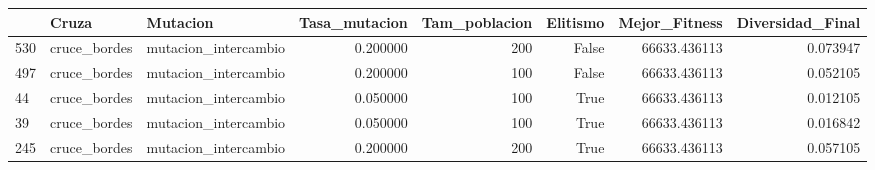 \begin{tabular}{lllrrrrr}
\toprule
 & Cruza & Mutacion & Tasa_mutacion & Tam_poblacion & Elitismo & Mejor_Fitness & Diversidad_Final \\
\midrule
530 & cruce_bordes & mutacion_intercambio & 0.200000 & 200 & False & 66633.436113 & 0.073947 \\
497 & cruce_bordes & mutacion_intercambio & 0.200000 & 100 & False & 66633.436113 & 0.052105 \\
44 & cruce_bordes & mutacion_intercambio & 0.050000 & 100 & True & 66633.436113 & 0.012105 \\
39 & cruce_bordes & mutacion_intercambio & 0.050000 & 100 & True & 66633.436113 & 0.016842 \\
245 & cruce_bordes & mutacion_intercambio & 0.200000 & 200 & True & 66633.436113 & 0.057105 \\
\bottomrule
\end{tabular}
